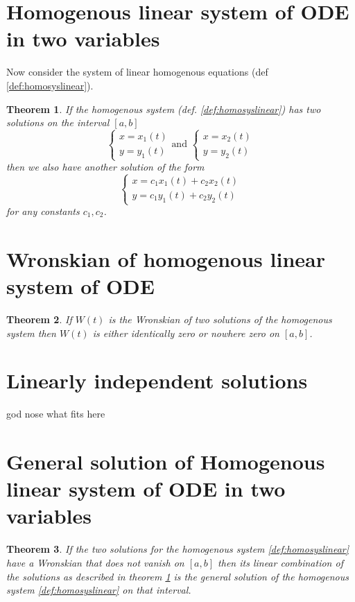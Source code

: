 \documentclass[oneside,11pt,pdftex,final]{book}%
\numberwithin{equation}{section}
\newtheorem{theorem}{Theorem}[chapter]%
\numberwithin{section}{chapter}
\numberwithin{equation}{chapter}
\begin{document}
\section{Homogenous linear system of ODE in two variables}
Now consider the system of linear homogenous equations (def \ref{def:homosyslinear}).

\begin{theorem}\label{th:linearsolution}
	If the homogenous system (def. \ref{def:homosyslinear}) has two solutions on the interval $ [a,b] $
	\[ \begin{cases}
		x=x_1(t)\\
		y=y_1(t)
	\end{cases} \text{and } \begin{cases}
		x=x_2(t)\\
		y=y_2(t)
	\end{cases}\]
	then we also have another solution of the form 
	\[ \begin{cases}
		x=c_1x_1(t)+c_2x_2(t)\\
		y=c_1y_1(t)+c_2y_2(t)
	\end{cases} \]
	for any constants $ c_1, c_2 $.
\end{theorem}


\section{Wronskian of homogenous linear system of ODE}
\begin{theorem}
	If $ W(t) $ is the Wronskian of two solutions of the homogenous system then $ W(t) $ is either identically zero or nowhere zero on $ [a,b] $.
\end{theorem}


\section{Linearly independent solutions}
god nose what fits here

\section{General solution of Homogenous linear system of ODE in two variables}

\begin{theorem}
	If the two solutions for the homogenous system \ref{def:homosyslinear} have a Wronskian that does not vanish on $ [a,b] $ then its linear combination of the solutions as described in theorem \ref{th:linearsolution} is the general solution of the homogenous system \ref{def:homosyslinear} on that interval.
\end{theorem}
\end{document}
